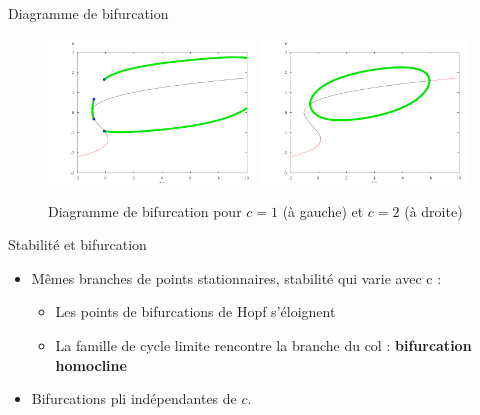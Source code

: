 \documentclass[xcolor={dvipsnames},10pt]{beamer}
\begin{document}
\begin{frame}{Diagramme de bifurcation}
\begin{figure}[H]
    \begin{center}
    \includegraphics[width=5.5cm]{Diag_bif_c_1.png}
    \includegraphics[width=5.5cm]{Diag_bif_c_2.png}
    \caption{Diagramme de bifurcation pour $c = 1$ (à gauche) et $c = 2$ (à droite)}
    \end{center}
\end{figure}

\end{frame}

\begin{frame}{Stabilité et bifurcation}
\begin{itemize}
\item Mêmes branches de points stationnaires, stabilité qui varie avec c :
\begin{itemize}
\item Les points de bifurcations de Hopf s'éloignent
\item La famille de cycle limite rencontre la branche du col : \textbf{bifurcation homocline}
\end{itemize}
\item Bifurcations pli indépendantes de $c$.
\end{itemize}

\end{frame}
\end{document}
